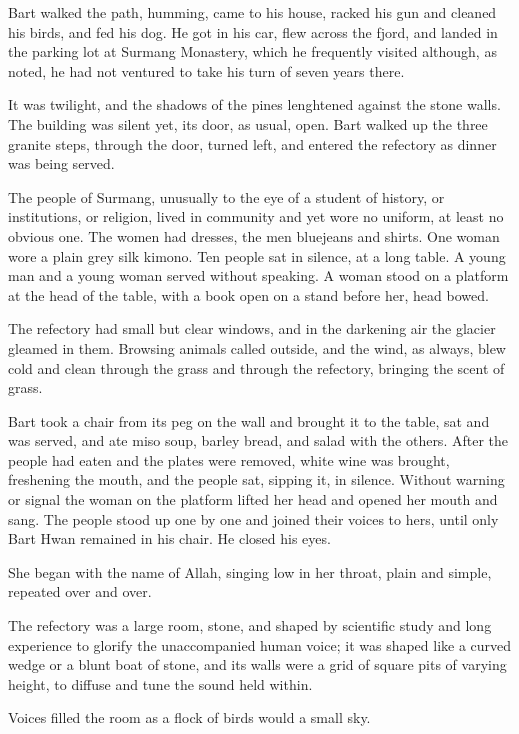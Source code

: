 \documentclass[english,11pt,letterpaper,onecolumn]{scrbook}
\begin{document}
	Bart walked the path, humming, came to his house, racked his gun and cleaned his birds, and fed his dog. He got in his car, flew across the fjord, and landed in the parking lot at Surmang Monastery, which he frequently visited although, as noted, he had not ventured to take his turn of seven years there. 

	It was twilight, and the shadows of the pines lenghtened against the stone walls. The building was silent yet, its door, as usual, open. Bart walked up the three granite steps, through the door, turned left, and entered the refectory as dinner was being served.

	The people of Surmang, unusually to the eye of a student of history, or institutions, or religion, lived in community and yet wore no uniform, at least no obvious one. The women had dresses, the men bluejeans and shirts.  One woman wore a plain grey silk kimono. Ten people sat in silence, at a long table. A young man and a young woman served without speaking. A woman stood on a platform at the head of the table, with a book open on a stand before her, head bowed. 

	The refectory had small but clear windows, and in the darkening air the glacier gleamed in them. Browsing animals called outside, and the wind, as always, blew cold and clean through the grass and through the refectory, bringing the scent of grass. 

	Bart took a chair from its peg on the wall and brought it to the table, sat and was served, and ate miso soup, barley bread, and salad with the others. After the people had eaten and the plates were removed, white wine was brought, freshening the mouth, and the people sat, sipping it, in silence. Without warning or signal the woman on the platform lifted her head and opened her mouth and sang. The people stood up one by one and joined their voices to hers, until only Bart Hwan remained in his chair. He closed his eyes.

	She began with the name of Allah, singing low in her throat, plain and simple, repeated over and over. 

	The refectory was a large room, stone, and shaped by scientific study and long experience to glorify the unaccompanied human voice; it was shaped like a curved wedge or a blunt boat of stone, and its walls were a grid of square pits of varying height, to diffuse and tune the sound held within. 

	Voices filled the room as a flock of birds would a small sky. 
\end{document}
